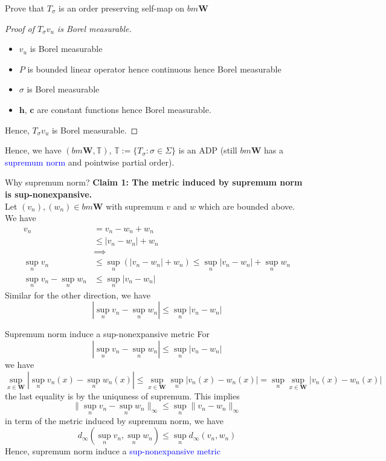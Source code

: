\documentclass[aspectratio=169]{beamer} %
\begin{document}
\begin{frame}{Prove that $T_\sigma$ is an order preserving self-map on $bm\mathbf{W}$}
    \begin{proof}[Proof of $T_\sigma v_u$ is Borel measurable]
        \begin{itemize}
            \item $v_u$ is Borel measurable
            \item $P$ is bounded linear operator hence continuous hence Borel measurable
            \item $\sigma$ is Borel measurable
            \item $\mathbf{h}$, $\mathbf{c}$ are constant functions hence Borel measurable.
        \end{itemize}
        Hence, $T_\sigma v_u$ is Borel measurable.
    \end{proof}
    Hence, we have $(bm\mathbf{W}, \mathbb{T})$, $\mathbb{T}:=\{T_\sigma: \sigma\in\Sigma\}$ is an ADP (still $bm\mathbf{W}$ has a \textcolor{blue}{supremum norm} and pointwise partial order).
\end{frame}
\begin{frame}{Why supremum norm?}
\textbf{Claim 1: The metric induced by supremum norm is sup-nonexpansive.}\\
Let $(v_n), (w_n)\in bm\mathbf{W}$ with supremum $v$ and $w$ which are bounded above. We have
\begin{align*}
    v_n &= v_n-w_n+w_n\\
    &\le |v_n-w_n|+w_n\\
    &\implies\\
    \sup_n v_n&\le \sup_n(|v_n-w_n|+w_n)\le \sup_n|v_n-w_n|+\sup_n w_n\\
    \sup_n v_n - \sup_nw_n&\le \sup_n|v_n-w_n|
\end{align*}
Similar for the other direction, we have
$$
|\sup_n v_n-\sup_nw_n|\le \sup_n|v_n-w_n|
$$
    
\end{frame}
\begin{frame}{Supremum norm induce a sup-nonexpansive metric}
For 
$$
|\sup_n v_n-\sup_nw_n|\le \sup_n|v_n-w_n|
$$
we have
$$
\sup_{x\in \mathbf{W}} |\sup_n v_n(x)-\sup_nw_n(x)|\le \sup_{x\in \mathbf{W}} \sup_n|v_n(x)-w_n(x)|= \sup_n\sup_{x\in \mathbf{W}}|v_n(x)-w_n(x)|
$$
the last equality is by the uniquness of supremum. This implies
$$
\|\sup_n v_n - \sup_n w_n\|_\infty \le \sup_n\|v_n-w_n\|_\infty
$$
in term of the metric induced by supremum norm, we have
$$
d_\infty(\sup_n v_n, \sup_n w_n)\le \sup_n d_\infty(v_n,w_n)
$$
Hence, supremum norm induce a \textcolor{blue}{sup-nonexpansive metric}
    
\end{frame}
\end{document}
